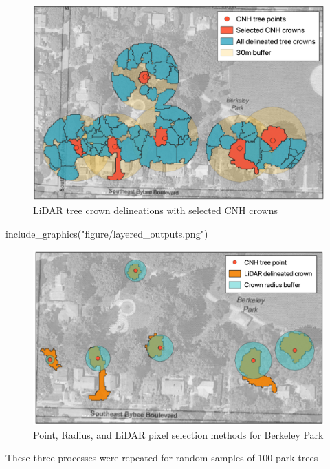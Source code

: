 \documentclass[12pt,twoside]{reedthesis}
\newenvironment{Shaded}{\begin{snugshade}}{\end{snugshade}}
\newcommand{\FunctionTok}[1]{\textcolor[rgb]{0.00,0.00,0.00}{#1}}
\newcommand{\NormalTok}[1]{#1}
\newcommand{\StringTok}[1]{\textcolor[rgb]{0.31,0.60,0.02}{#1}}
\begin{document}
\begin{figure}

{\centering \includegraphics[width=0.8\linewidth]{figure/selected_lidar} 

}

\caption{LiDAR tree crown delineations with selected CNH crowns}\label{fig:unnamed-chunk-4}
\end{figure}
\begin{Shaded}
\begin{Highlighting}[]
\FunctionTok{include\_graphics}\NormalTok{(}\StringTok{"figure/layered\_outputs.png"}\NormalTok{)}
\end{Highlighting}
\end{Shaded}
\begin{figure}

{\centering \includegraphics[width=0.9\linewidth]{figure/layered_outputs} 

}

\caption[Pixel selection method comparison]{Point, Radius, and LiDAR pixel selection methods for Berkeley Park}\label{fig:layered-outputs}
\end{figure}
These three processes were repeated for random samples of 100 park trees
\end{document}
